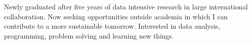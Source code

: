 

\begin{cvparagraph}

Newly graduated after five years of data intensive research in large international collaboration. 
Now seeking opportunities outside academia in which I can contribute to a more sustainable tomorrow.
Interested in data analysis, programming, problem solving and learning new things. 

\end{cvparagraph}